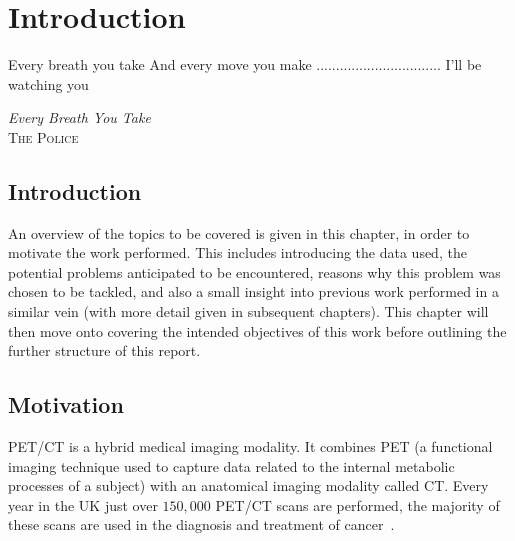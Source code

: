 \chapter{Introduction} \label{sec:introduction}
    \vspace*{\fill}
    \setlength{\epigraphwidth}{0.3\linewidth}
    \renewcommand{\epigraphflush}{flushright}
    \renewcommand{\epigraphsize}{\footnotesize}
    \epigraph{Every breath you take\newline
              And every move you make\newline
              ................................\newline
              I'll be watching you}%
              {\textit{Every Breath You Take}\\ \textsc{The Police}}
    
    \newpage
    
    \section{Introduction} \label{sec:introduction_introduction}
        An overview of the topics to be covered is given in this chapter, in order to motivate the work performed. This includes introducing the data used, the potential problems anticipated to be encountered, reasons why this problem was chosen to be tackled, and also a small insight into previous work performed in a similar vein (with more detail given in subsequent chapters). This chapter will then move onto covering the intended objectives of this work before outlining the further structure of this report.
    
    \section{Motivation} \label{sec:motivation}
        \gls{PET}/\gls{CT} is a hybrid medical imaging modality. It combines \gls{PET} (a functional imaging technique used to capture data related to the internal metabolic processes of a subject) with an anatomical imaging modality called \gls{CT}. Every year in the \gls{UK} just over $150,000$ \gls{PET}/\gls{CT} scans are performed, the majority of these scans are used in the diagnosis and treatment of cancer~\parencite{NHSEngland2020Diagnostic2019/20}.
    
